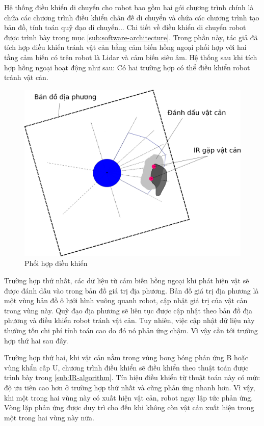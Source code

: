 Hệ thống điều khiển di chuyển cho robot bao gồm hai gói chương trình chính là  chứa các chương trình điều khiển chân đế di chuyển và  chứa các chương trình tạo bản đồ, tính toán quỹ đạo di chuyển... Chi tiết về điều khiển di chuyển robot được trình bày trong mục \ref{sub:software-architecture}.
Trong phần này, tác giả đã tích hợp điều khiển tránh vật cản bằng cảm biến hồng ngoại phối hợp với hai tầng cảm biến có trên robot là Lidar và cảm biến siêu âm. Hệ thống sau khi tích hợp hồng ngoại hoạt động như sau: Có hai trường hợp có thể điều khiển robot tránh vật cản.

\begin{figure}[htbp]
    \centering
    \includegraphics[width = 0.75\linewidth]{figures/IR_BB-costmap.png}
    \caption{Phối hợp điều khiển}
    \label{fig:bb-vs-costmap}
\end{figure}

Trường hợp thứ nhất, các dữ liệu từ cảm biến hồng ngoại khi phát hiện vật sẽ được đánh dấu vào trong bản đồ giá trị địa phương. Bản đồ giá trị địa phương là một vùng bản đồ ô lưới hình vuông quanh robot, cập nhật giá trị của vật cản trong vùng này. Quỹ đạo địa phương sẽ liên tục được cập nhật theo bản đồ địa phương và điều khiển robot tránh vật cản. Tuy nhiên, việc cập nhật dữ liệu này thường tốn chi phí tính toán cao do đó nó phản ứng chậm. Vì vậy cần tới trường hợp thứ hai sau đây.

Trường hợp thứ hai, khi vật cản nằm trong vùng bong bóng phản ứng B hoặc vùng khẩn cấp U, chương trình điều khiển sẽ điều khiển theo thuật toán được trình bày trong \ref{sub:IR-algorithm}. Tín hiệu điều khiển từ thuật toán này có mức độ ưu tiên cao hơn ở trường hợp thứ nhất và cũng phản ứng nhanh hơn. Vì vậy, khi một trong hai vùng này có xuất hiện vật cản, robot ngay lập tức phản ứng. Vòng lặp phản ứng được duy trì cho đến khi không còn vật cản xuất hiện trong một trong hai vùng này nữa.


